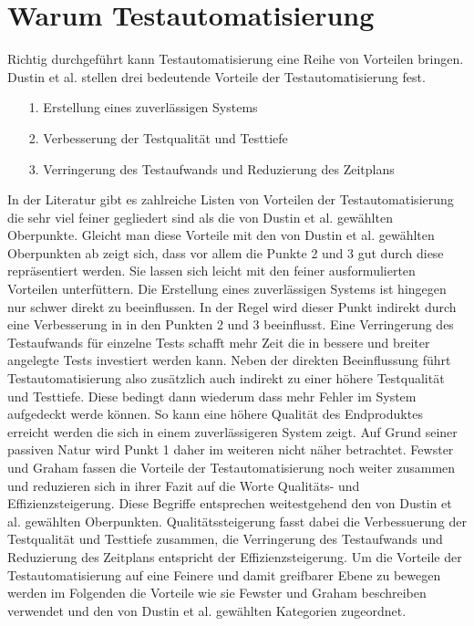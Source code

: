 \section{Warum Testautomatisierung}
\label{sec:warum_testautomatisierung}

Richtig durchgeführt kann Testautomatisierung eine Reihe von Vorteilen bringen. Dustin et al. stellen drei bedeutende Vorteile der Testautomatisierung fest. \cite[S.44 ff.]{dustin_software_2001}
\begin{itemize}
\item[1.] Erstellung eines zuverlässigen Systems
\item[2.] Verbesserung der Testqualität und Testtiefe
\item[3.] Verringerung des Testaufwands und Reduzierung des Zeitplans
\end{itemize}


In der Literatur gibt es zahlreiche Listen von Vorteilen der Testautomatisierung die sehr viel feiner gegliedert sind als die von Dustin et al. gewählten Oberpunkte. \cite{fewster_software_1999} \cite{thaller_software-test_2002}
Gleicht man diese Vorteile mit den von Dustin et al. gewählten Oberpunkten ab zeigt sich, dass vor allem die Punkte 2 und 3 gut durch diese repräsentiert werden. Sie lassen sich leicht mit den feiner ausformulierten Vorteilen unterfüttern. Die Erstellung eines zuverlässigen Systems ist hingegen nur schwer direkt zu beeinflussen. In der Regel wird dieser Punkt indirekt durch eine Verbesserung in in den Punkten 2 und 3 beeinflusst.
Eine Verringerung des Testaufwands für einzelne Tests schafft mehr Zeit die in bessere und breiter angelegte Tests investiert werden kann. Neben der direkten Beeinflussung führt Testautomatisierung also zusätzlich auch indirekt zu einer höhere Testqualität und Testtiefe. Diese bedingt dann wiederum dass mehr Fehler im System aufgedeckt werde können. So kann eine höhere Qualität des Endproduktes erreicht werden die sich in einem zuverlässigeren System zeigt.
Auf Grund seiner passiven Natur wird Punkt 1 daher im weiteren nicht näher betrachtet.
Fewster und Graham fassen die Vorteile der Testautomatisierung noch weiter zusammen und reduzieren sich in ihrer Fazit auf die Worte Qualitäts- und Effizienzsteigerung.
Diese Begriffe entsprechen weitestgehend den von Dustin et al. gewählten Oberpunkten. Qualitätssteigerung fasst dabei die Verbessuerung der Testqualität und Testtiefe zusammen, die Verringerung des Testaufwands und Reduzierung des Zeitplans entspricht der Effizienzsteigerung. 
Um die Vorteile der Testautomatisierung auf eine Feinere und damit greifbarer Ebene zu bewegen werden im Folgenden die Vorteile wie sie 
Fewster und Graham beschreiben verwendet und den von Dustin et al. gewählten Kategorien zugeordnet.

